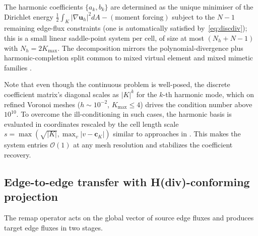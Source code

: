 \documentclass[10pt]{article}
\newcommand{\uh}{\mathbf{u}_h}
\begin{document}
The harmonic coefficients $\{a_k, b_k\}$ are determined as the unique minimiser of the Dirichlet energy
$\tfrac12\!\int_K |\nabla\uh|^2 dA - (\text{moment forcing})$
subject to the $N{-}1$ remaining edge-flux constraints (one is automatically satisfied by~\eqref{eq:discdiv}); this is a small linear saddle-point system per cell, of size at most $(N_h + N{-}1)$ with $N_h = 2K_{\max}$. The decomposition mirrors the polynomial-divergence plus harmonic-completion split common to mixed virtual element and mixed mimetic families \cite{BrezziFalkMarini2014,BeiraoDaVeigaMixed2016}.

Note that even though the continuous problem is well-posed, the discrete coefficient matrix's diagonal scales as $|K|^k$ for the $k$-th harmonic mode, which on refined Voronoi meshes ($h\!\sim\!10^{-2}$, $K_{\max}\!\le\!4$) drives the condition number above $10^{10}$. To overcome the ill-conditioning in such cases, the harmonic basis is evaluated in coordinates rescaled by the cell length scale $s = \max(\sqrt{|K|},\max_v|v - \mathbf{c}_K|)$ similar to approaches in \cite{LipnikovManziniShashkov2014}. This makes the system entries $\mathcal{O}(1)$ at any mesh resolution and stabilizes the coefficient recovery.

\subsection{Edge-to-edge transfer with H(div)-conforming projection}

The remap operator acts on the global vector of source edge fluxes and produces target edge fluxes in two stages.
\end{document}
